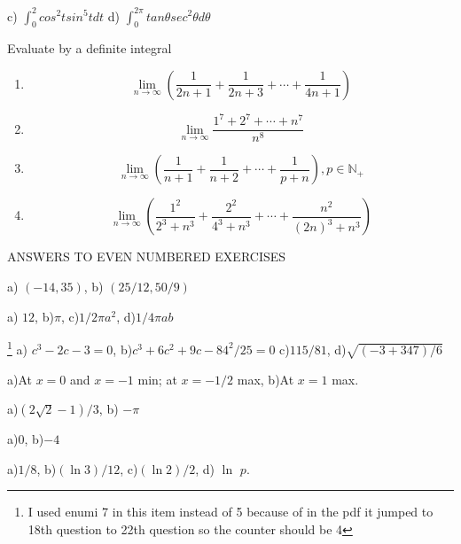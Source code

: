 \documentclass[11pt]{amsbook}
\begin{document}
	
	\begin{flushleft}
		
	c) $\int_0^2 cos^2t sin^5t dt$  \hspace{1cm} d) $\int_{0}^{2\pi} tan\theta sec^2\theta d\theta$
	
	\end{flushleft}	 \vspace{1cm}

	\begin{hEnumerateArabic}
	 \item Evaluate by a definite integral
	 
	\end{hEnumerateArabic}
	
	\renewcommand{\labelenumi}{\alph{enumi})}
	\begin{enumerate}

		\item $$\lim_{n\to\infty} \left(\frac{1}{2n + 1} +\frac{1}{2n + 3} + \cdots
		 + \frac{1}{4n + 1}\right)$$
		\item $$\lim_{n\to\infty}\frac{1^7 + 2^7 + \cdots + n^7}{n^8}$$	
		\item $$\lim_{n\to\infty} \left(\frac{1}{n + 1} +\frac{1}{n + 2} + \cdots
		+ \frac{1}{p+n}\right), p\in \mathbb{N_+}$$
		\item $$\lim_{n\to\infty} \left(\frac{1^2}{2^3 + n^3} +\frac{2^2}{4^3 + n^3} + \cdots
		+ \frac{n^2}{(2n)^3 + n^3}\right)$$
		
	\end{enumerate} 

\vspace{1cm} ANSWERS TO EVEN NUMBERED EXERCISES

\begin{flushleft}
	\begin{hEnumerateArabic}
	\setcounter{enumi}{1}
	\item  a) $(-14, 35)$,  b) $(25/12, 50/9)$
	\setcounter{enumi}{3}
	\item  a) $12$,  b)$\pi$,   c)$1/2$$\pi$$a^2$,  d)$1/4$$\pi$$ab$
	\setcounter{enumi}{7}
	\item \footnote{I used enumi 7 in this item instead of 5 because of in the pdf it jumped to 18th question to 22th question so the counter should be 4}  
	 a) $c^3 -2c -3=0$, b)$c^3 + 6c^2 + 9c - 84^2/25 =0$
	 c)$115/81$,  d)$\sqrt{(-3 +347)/6}$ 
	\setcounter{enumi}{9}
	\item  a)At $x=0$ and $x= -1$ min; at $x= -1/2$ max,
	b)At $x=1$ max.
	\setcounter{enumi}{11}
	\item  a)$(2\sqrt{2}-1)/3$, b) $-\pi$
	\setcounter{enumi}{13}
	\item  a)$0$, b)$-4$
	\setcounter{enumi}{15}
	\item  a)$1/8$, b)$(\ln3)/12$, c)$(\ln2)/2$, d) $\ln$ $p$.
	
	\end{hEnumerateArabic}

\end{flushleft}
\end{document}
